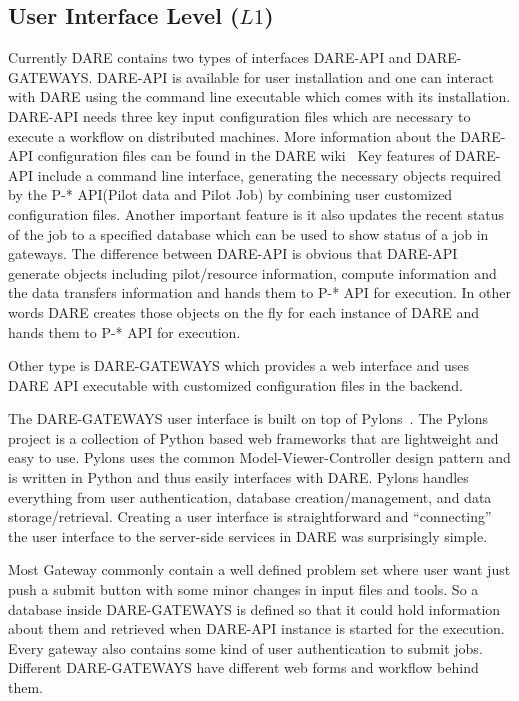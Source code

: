 \documentclass[]{svjour3}
\begin{document}
\subsection{User Interface Level ($L1$)}

Currently DARE contains two types of interfaces  DARE-API and DARE-GATEWAYS.
DARE-API is available for user installation and one can interact with DARE using the command line
executable which comes with its installation. DARE-API needs three key input configuration files which
are necessary to execute a workflow on distributed machines. More information about the DARE-API configuration files
can be found in the DARE wiki~\cite{dare_api_web}
Key features of DARE-API include a command line interface, generating the necessary 
objects required by the P-* API(Pilot data and Pilot Job) by combining user customized configuration files. Another important feature is 
it also updates the recent status of the job to a specified database which can be 
used to show status of a job in gateways. The difference between DARE-API is obvious that DARE-API
generate objects including pilot/resource information, compute information and the data transfers information and hands them to
P-* API for execution. In other words DARE creates those objects on the fly for each instance of DARE  and 
hands them to P-* API for execution. 


Other type is DARE-GATEWAYS which provides 
a web interface and uses DARE API executable with customized configuration files in the backend.


The DARE-GATEWAYS user interface is built on top of
Pylons~\cite{pylons_website}. The Pylons project is a collection of
Python based web frameworks that are lightweight and easy to use. Pylons
uses the common Model-Viewer-Controller design pattern and is written
in Python and thus easily interfaces with DARE. Pylons handles everything
from user authentication, database creation/management,
and data storage/retrieval. Creating a user interface is straightforward
and ``connecting'' the user interface to the server-side services in DARE
was surprisingly simple.

Most Gateway commonly contain a well defined problem set where user want just
push a submit button with some minor changes in input files and tools. So a database inside
DARE-GATEWAYS is defined so that it could hold information about them and retrieved when
DARE-API instance is started for the execution. Every gateway also contains some kind of user authentication
to submit jobs. Different DARE-GATEWAYS have different web forms and workflow behind them.
\end{document}

